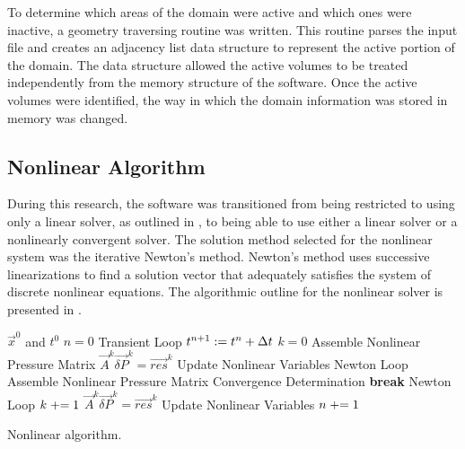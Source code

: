 To determine which areas of the domain were active and which ones were inactive, a geometry traversing routine was written.
This routine parses the \cobra{} input file and creates an adjacency list data structure to represent the active portion of the domain.
The data structure allowed the active volumes to be treated independently from the memory structure of the software.
Once the active volumes were identified, the way in which the domain information was stored in memory was changed.

\subsection{Nonlinear Algorithm}
\label{subsect:nlnCobraAlgo}

During this research, the \cobra{} software was transitioned from being restricted to using only a linear solver, as outlined in , to being able to use either a linear solver or a nonlinearly convergent solver. 
The solution method selected for the nonlinear system was the iterative Newton's method.
Newton's method uses successive linearizations to find a solution vector that adequately satisfies the system of discrete nonlinear equations.
The algorithmic outline for the nonlinear solver is presented in .

\begin{algo}[ht!]
\setlength{\baselineskip}{0.625\baselineskip}
\begin{algorithmic}[1]
\Require $\vec{x}^{0}$ and $t^{0}$
\Set $n = 0$
\Loop \; Transient Loop
    \Set $t^{n+1} : = t^{n} + \dt{}$
    \Set $k = 0$
	\Algorithm Assemble Nonlinear Pressure Matrix	 
	\Solve $\vec{A}^{k} \vec{\delta P}^{k} = \vec{res}^{k}$
	\Algorithm Update Nonlinear Variables  
    \Loop \; Newton Loop
		\Algorithm Assemble Nonlinear Pressure Matrix 
		\Algorithm Convergence Determination 
			\State \textbf{break} Newton Loop 
		\EndIf		
		\Set $k \mathrel{+}= 1$
		\Solve $\vec{A}^{k} \vec{\delta P}^{k} = \vec{res}^{k}$
		\Algorithm Update Nonlinear Variables 
	\EndLoop
	\Set $n \mathrel{+}= 1$
\EndLoop
\end{algorithmic}
\caption{Nonlinear \cobra{} algorithm.}
\label{alg:nlnCobraAlgorithm}
\end{algo}

